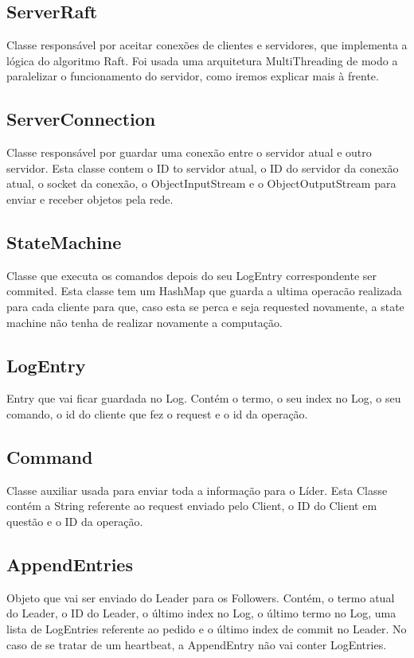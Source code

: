 \documentclass[12pt,a4paper]{report}
\begin{document}
\subsection{ServerRaft}
Classe responsável por aceitar conexões de clientes e servidores, que implementa a lógica do algoritmo Raft. Foi usada uma arquitetura MultiThreading de modo a paralelizar o funcionamento do servidor, como iremos explicar mais à frente.

\subsection{ServerConnection}
Classe responsável por guardar uma conexão entre o servidor atual e outro servidor. Esta classe contem o ID to servidor atual, o ID do servidor da conexão atual, o socket da conexão, o ObjectInputStream e o ObjectOutputStream para enviar e receber objetos pela rede.

\subsection{StateMachine}
Classe que executa os comandos depois do seu LogEntry correspondente ser commited. Esta classe tem um HashMap que guarda a ultima operacão realizada para cada cliente para que, caso esta se perca e seja requested novamente, a state machine não tenha de realizar novamente a computação.

\subsection{LogEntry}
Entry que vai ficar guardada no Log. Contém o termo, o seu index no Log, o seu comando, o id do cliente que fez o request e o id da operação.

\subsection{Command}
Classe auxiliar usada para enviar toda a informação para o Líder. Esta Classe contém a String referente ao request enviado pelo Client, o ID do Client em questão e o ID da operação.

\subsection{AppendEntries}
Objeto que vai ser enviado do Leader para os Followers. Contém, o termo atual do Leader, o ID do Leader, o último index no Log, o último termo no Log, uma lista de LogEntries referente ao pedido e o último index de commit no Leader. No caso de se tratar de um heartbeat, a AppendEntry não vai conter LogEntries.
\end{document}
